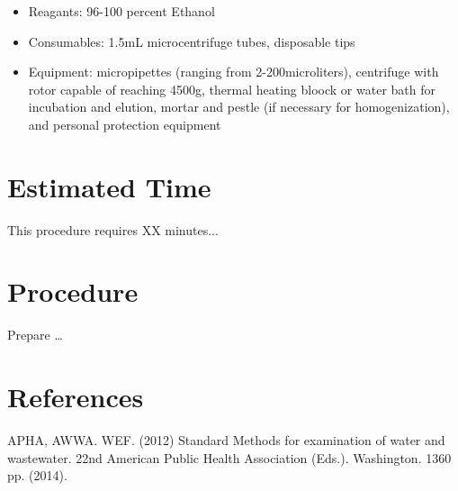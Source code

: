 \documentclass[12pt]{../SOP3_alpha}
\begin{document}
\NP \begin{itemize}
  \item Reagants: 96-100 percent Ethanol 
  \item Consumables: 1.5mL microcentrifuge tubes, disposable tips
  \item Equipment: micropipettes (ranging from 2-200microliters), centrifuge with rotor capable of reaching 4500g, thermal heating bloock or water bath for incubation and elution, mortar and pestle (if necessary for homogenization), and personal protection equipment
\end{itemize}


 

\section{Estimated Time}

\NP This procedure requires XX minutes...

\section{Procedure}

\NP Prepare \dots

\NP

\section{References}

\NP APHA, AWWA. WEF. (2012) Standard Methods for examination of water and wastewater. 22nd American Public Health Association (Eds.). Washington. 1360 pp. (2014).
\end{document}
